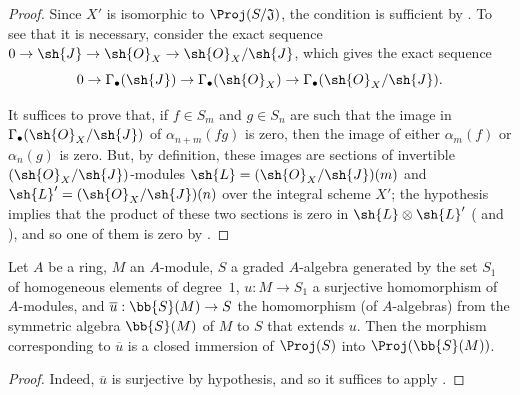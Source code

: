 
\begin{proof}
Since $X'$ is isomorphic to $\Proj(S/\mathfrak{J})$, the condition is sufficient by .
To see that it is necessary, consider the exact sequence $0\to\sh{J}\to\sh{O}_X\to\sh{O}_X/\sh{J}$, which gives the exact sequence
\[
  0 \to \Gamma_\bullet(\sh{J}) \to \Gamma_\bullet(\sh{O}_X) \to \Gamma_\bullet(\sh{O}_X/\sh{J}).
\]

It suffices to prove that, if $f\in S_m$ and $g\in S_n$ are such that the image in $\Gamma_\bullet(\sh{O}_X/\sh{J})$ of $\alpha_{n+m}(fg)$ is zero, then the image of either $\alpha_m(f)$ or $\alpha_n(g)$ is zero.
But, by definition, these images are sections of invertible $(\sh{O}_X/\sh{J})$-modules $\sh{L}=(\sh{O}_X/\sh{J})(m)$ and $\sh{L}'=(\sh{O}_X/\sh{J})(n)$ over the integral scheme $X'$;
the hypothesis implies that the product of these two sections is zero in $\sh{L}\otimes\sh{L}'$ ( and ), and so one of them is zero by .
\end{proof}

\begin{corollary}[2.9.5]
\label{II.2.9.5}
Let $A$ be a ring, $M$ an $A$-module, $S$ a graded $A$-algebra generated by the set $S_1$ of homogeneous elements of degree~$1$, $u:M\to S_1$ a surjective homomorphism of $A$-modules, and $\overline{u}:\bb{S}(M)\to S$ the homomorphism (of $A$-algebras) from the symmetric algebra $\bb{S}(M)$ of $M$ to $S$ that extends $u$.
Then the morphism corresponding to $\overline{u}$ is a closed immersion of $\Proj(S)$ into $\Proj(\bb{S}(M))$.
\end{corollary}

\begin{proof}
Indeed, $\overline{u}$ is surjective by hypothesis, and so it suffices to apply .
\end{proof}
